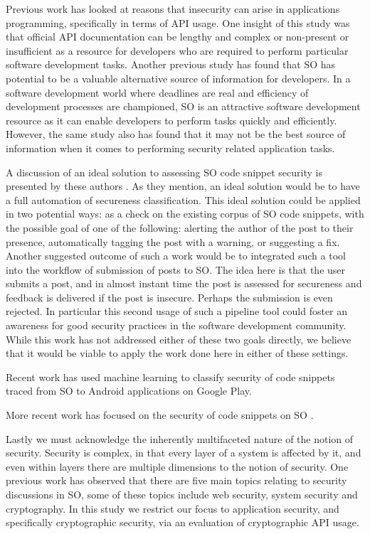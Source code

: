 \documentclass[10pt, conference]{IEEEtran}
\begin{document}
Previous work \cite{} has looked at reasons that insecurity can arise in applications programming, specifically in terms of API usage. One insight of this study was that official API documentation can be lengthy and complex or non-present or insufficient as a resource for developers who are required to perform particular software development tasks. Another previous study \cite{} has found that SO has potential to be a valuable alternative source of information for developers. In a software development world where deadlines are real and efficiency of development processes are championed, SO is an attractive software development resource as it can enable developers to perform tasks quickly and efficiently. However, the same study also has found that it may not be the best source of information when it comes to performing security related application tasks.


A discussion of an ideal solution to assessing SO code snippet security is presented by these authors \cite{}. As they mention, an ideal solution would be to have a full automation of secureness classification. This ideal solution could be applied in two potential ways: as a check on the existing corpus of SO code snippets, with the possible goal of one of the following: alerting the author of the post to their presence, automatically tagging the post with a warning, or suggesting a fix. Another suggested outcome of such a work would be to integrated such a tool into the workflow of submission of posts to SO. The idea here is that the user submits a post, and in almost instant time the post is assessed for secureness and feedback is delivered if the post is insecure. Perhaps the submission is even rejected. In particular this second usage of such a pipeline tool could foster an awareness for good security practices in the software development community. While this work has not addressed either of these two goals directly, we believe that it would be viable to apply the work done here in either of these settings.

Recent work \cite{7958574} has used machine learning to classify security of code snippets traced from SO to Android applications on Google Play. 
 
 More recent work has focused on the security of code snippets on SO \cite{DBLP:journals/corr/abs-1901-01327}. 
 
 
Lastly we must acknowledge the inherently multifaceted nature of the notion of security. Security is complex, in that every layer of a system is affected by it, and even within layers there are multiple dimensions to the notion of security. One previous work \cite{} has observed that there are five main topics relating to security discussions in SO, some of these topics include web security, system security and cryptography. In this study we restrict our focus to application security, and specifically cryptographic security, via an evaluation of cryptographic API usage.
\end{document}
